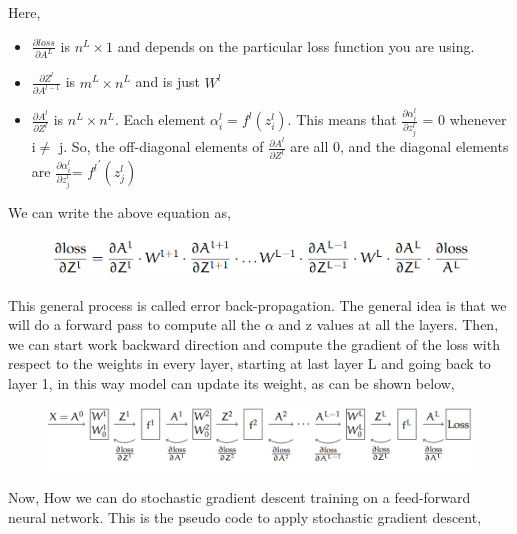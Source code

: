 Here,
\begin{itemize}
    \item $\frac{\partial loss}{\partial A^L}$ is $n^L \times 1$ and depends on the particular loss function you are using.
    \item $\frac{\partial Z^l}{\partial A^{l-1}}$ is $m^L \times n^L$ and is just $W^l$
    \item $\frac{\partial A^l}{\partial Z^l}$ is $n^L \times n^L$. Each element $\alpha_i ^l = f^l(z_i ^l)$. This means that $\frac{\partial \alpha_i ^l}{\partial z_j ^l}$ = 0 whenever i$\neq$ j. So, the off-diagonal elements of $\frac{\partial A^l}{\partial Z^l}$ are all 0, and the diagonal elements are $\frac{\partial \alpha_i ^l}{\partial z_j ^l}$= ${f^l}^'(z_j ^l)$
\end{itemize}
We can write the above equation as,
\begin{figure}[H]
    \centering
    \includegraphics[scale=0.3]{Figure/ml__09.png}
    \label{fig:my_label}
\end{figure}

This general process is called error back-propagation. The general idea is that we will do a forward
pass to compute all the $\alpha$ and z values at all the layers. Then, we can start work backward direction and compute the gradient of the loss with respect
to the weights in every layer, starting at last layer L and going back to layer 1, in this way model can update its weight, as can be shown below,\\
\begin{figure}[H]
    \centering
    \includegraphics[scale=0.3]{Figure/ml__10.png}
    \label{fig:my_label}
\end{figure}




Now, How we can do stochastic gradient descent training on a feed-forward neural network. This is the pseudo code to apply stochastic gradient descent,


